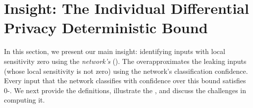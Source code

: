 \section{Insight: The Individual Differential Privacy Deterministic Bound}
\label{sec:formalization}
In this section, we present our main insight:
identifying inputs with local sensitivity zero using the  
\emph{network's \propl} (\propa). 
The \propa overapproximates the leaking inputs (whose local sensitivity is not zero) using the network's classification confidence.
Every input that the network classifies with confidence over this bound satisfies 0-\propi. %
We next provide the definitions, illustrate the \propa, and discuss the challenges in computing it. %


